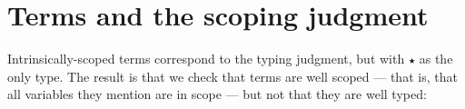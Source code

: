 \hypertarget{terms-and-the-scoping-judgment}{%
\section{Terms and the scoping
judgment}\label{terms-and-the-scoping-judgment}}

Intrinsically-scoped terms correspond to the typing judgment, but with
\texttt{★} as the only type. The result is that we check that terms are
well scoped --- that is, that all variables they mention are in scope
--- but not that they are well typed:

\begin{fence}
\begin{code}%
\>[0]\AgdaSpace{}%
\AgdaSpace{}%
\AgdaSymbol{:}\AgdaSpace{}%
\AgdaSpace{}%
\AgdaSpace{}%
\AgdaSpace{}%
\AgdaSpace{}%
\AgdaSpace{}%
\<%
\\
%
\\[\AgdaEmptyExtraSkip]%
\>[0][@{}l@{\AgdaIndent{0}}]%
\>[2]\AgdaSpace{}%
\AgdaSymbol{:}\AgdaSpace{}%
\AgdaSpace{}%
\AgdaSymbol{\{}\AgdaSpace{}%
\AgdaSymbol{\}}\<%
\\
\>[2][@{}l@{\AgdaIndent{0}}]%
\>[4]%
\>[127I]\AgdaSpace{}%
\AgdaSpace{}%
\<%
\\
\>[.][@{}l@{}]\<[127I]%
\>[6]\AgdaComment{-----}\<%
\\
%
\>[4]\AgdaSpace{}%
\AgdaSpace{}%
\AgdaSpace{}%
\<%
\\
%
\\[\AgdaEmptyExtraSkip]%
%
\>[2]%
\>[6]\AgdaSymbol{:}%
\>[9]\AgdaSpace{}%
\AgdaSymbol{\{}\AgdaSymbol{\}}\<%
\\
\>[2][@{}l@{\AgdaIndent{0}}]%
\>[4]%
\>[134I]\AgdaSpace{}%
\AgdaOperator{\AgdaInductiveConstructor{,}}\AgdaSpace{}%
\AgdaSpace{}%
\AgdaSpace{}%
\<%
\\
\>[.][@{}l@{}]\<[134I]%
\>[6]\AgdaComment{---------}\<%
\\
%
\>[4]\AgdaSpace{}%

\end{code}
\end{fence}

